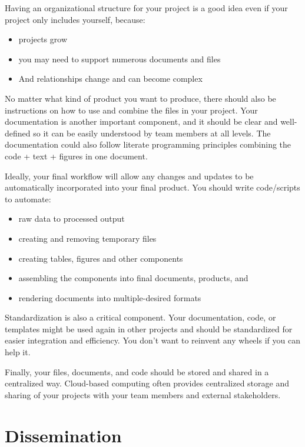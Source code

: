 \documentclass[
]{book}
\providecommand{\tightlist}{%
  \setlength{\itemsep}{0pt}\setlength{\parskip}{0pt}}
\begin{document}
Having an organizational structure for your project is a good idea even if your project only includes yourself, because:

\begin{itemize}
\tightlist
\item
  projects grow
\item
  you may need to support numerous documents and files
\item
  And relationships change and can become complex
\end{itemize}

No matter what kind of product you want to produce, there should also be instructions on how to use and combine the files in your project. Your documentation is another important component, and it should be clear and well-defined so it can be easily understood by team members at all levels. The documentation could also follow literate programming principles combining the code + text + figures in one document.

Ideally, your final workflow will allow any changes and updates to be automatically incorporated into your final product. You should write code/scripts to automate:

\begin{itemize}
\tightlist
\item
  raw data to processed output
\item
  creating and removing temporary files
\item
  creating tables, figures and other components
\item
  assembling the components into final documents, products, and
\item
  rendering documents into multiple-desired formats
\end{itemize}

Standardization is also a critical component. Your documentation, code, or templates might be used again in other projects and should be standardized for easier integration and efficiency. You don't want to reinvent any wheels if you can help it.

Finally, your files, documents, and code should be stored and shared in a centralized way. Cloud-based computing often provides centralized storage and sharing of your projects with your team members and external stakeholders.

\hypertarget{dissemination}{%
\section{Dissemination}\label{dissemination}}
\end{document}
